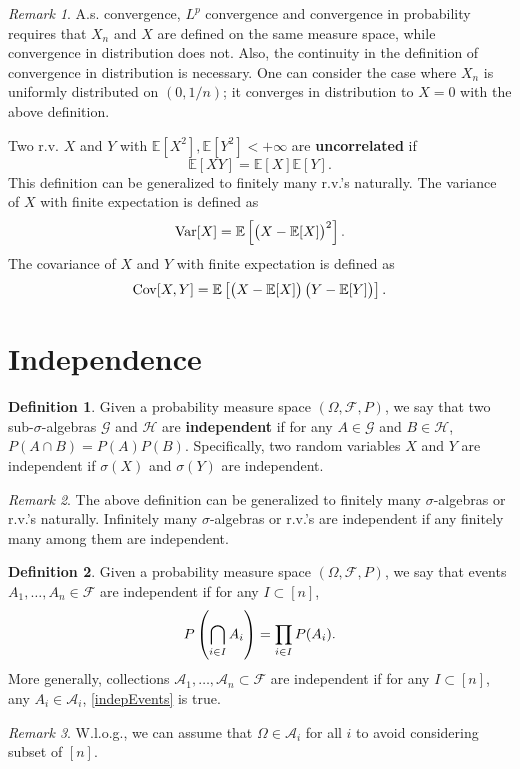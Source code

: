 \documentclass[openany]{book}
\theoremstyle{definition}
\newtheorem{definition}{Definition}[chapter]
\theoremstyle{remark}
\newtheorem*{remark}{Remark}
\begin{document}
\begin{remark}
    A.s. convergence, $L^p$ convergence and convergence in probability requires that $X_n$ and $X$ are defined on the same measure space, while convergence in distribution does not. Also, the continuity in the definition of convergence in distribution is necessary. One can consider the case where $X_n$ is uniformly distributed on $(0,1/n)$; it converges in distribution to $X=0$ with the above definition.
\end{remark}

Two r.v. $X$ and $Y$ with $\mathbb{E}[X^2],\mathbb{E}[Y^2]<+\infty$ are \textbf{uncorrelated} if
\begin{equation*}
    \mathbb{E}[XY]=\mathbb{E}[X]\mathbb{E}[Y].
\end{equation*}
This definition can be generalized to finitely many r.v.'s naturally. The variance of $X$ with finite expectation is defined as
\begin{equation*}
    \mathrm{Var}[X]=\mathbb{E}\sbr{\del{X-\mathbb{E}[X]}^2}.
\end{equation*}
The covariance of $X$ and $Y$ with finite expectation is defined as
\begin{equation*}
    \mathrm{Cov}[X,Y]=\mathbb{E}\sbr[1]{\del{X-\mathbb{E}[X]}\del{Y-\mathbb{E}[Y]}}.
\end{equation*}

\section{Independence}
\begin{definition}
    Given a probability measure space $(\Omega,\mathcal{F},P)$, we say that two sub-$\sigma$-algebras $\mathcal{G}$ and $\mathcal{H}$ are \textbf{independent} if for any $A\in \mathcal{G}$ and $B\in \mathcal{H}$, $P(A\cap B)=P(A)P(B)$. Specifically, two random variables $X$ and $Y$ are independent if $\sigma(X)$ and $\sigma(Y)$ are independent.
\end{definition}
\begin{remark}
    The above definition can be generalized to finitely many $\sigma$-algebras or r.v.'s naturally. Infinitely many $\sigma$-algebras or r.v.'s are independent if any finitely many among them are independent.
\end{remark}
\begin{definition}
    Given a probability measure space $(\Omega,\mathcal{F},P)$, we say that events $A_1,\ldots,A_n\in \mathcal{F}$ are independent if for any $I\subset[n]$,
    \begin{equation}\label{indepEvents}
        P\del{\bigcap_{i\in I}A_i}=\prod_{i\in I}P(A_i).
    \end{equation}
    More generally, collections $\mathcal{A}_1,\ldots,\mathcal{A}_n\subset \mathcal{F}$ are independent if for any $I\subset[n]$, any $A_i\in \mathcal{A}_i$, \eqref{indepEvents} is true.
\end{definition}
\begin{remark}
    W.l.o.g., we can assume that $\Omega\in \mathcal{A}_i$ for all $i$ to avoid considering subset of $[n]$.
\end{remark}
\end{document}
